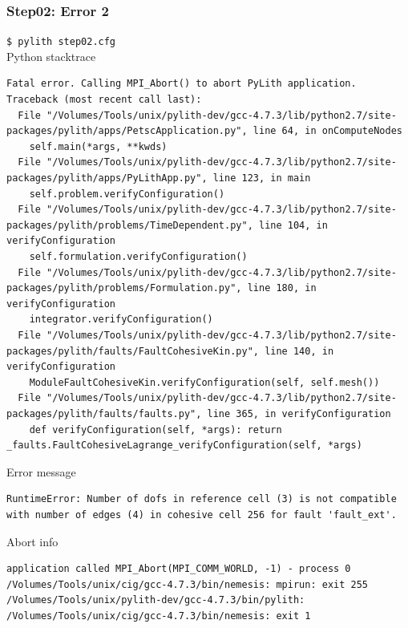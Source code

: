 \documentclass{beamer}
\newcommand{\cmd}[1]{{\tiny\tt \color{ltred}#1}}
\newcommand{\errlabel}[1]{{\small \color{blue}#1}}
\begin{document}
\begin{frame}[fragile]
  \frametitle{Step02: Error 2}

\cmd{\$ pylith step02.cfg}\\
\errlabel{Python stacktrace}
\begin{lstlisting}
Fatal error. Calling MPI_Abort() to abort PyLith application.
Traceback (most recent call last):
  File "/Volumes/Tools/unix/pylith-dev/gcc-4.7.3/lib/python2.7/site-packages/pylith/apps/PetscApplication.py", line 64, in onComputeNodes
    self.main(*args, **kwds)
  File "/Volumes/Tools/unix/pylith-dev/gcc-4.7.3/lib/python2.7/site-packages/pylith/apps/PyLithApp.py", line 123, in main
    self.problem.verifyConfiguration()
  File "/Volumes/Tools/unix/pylith-dev/gcc-4.7.3/lib/python2.7/site-packages/pylith/problems/TimeDependent.py", line 104, in verifyConfiguration
    self.formulation.verifyConfiguration()
  File "/Volumes/Tools/unix/pylith-dev/gcc-4.7.3/lib/python2.7/site-packages/pylith/problems/Formulation.py", line 180, in verifyConfiguration
    integrator.verifyConfiguration()
  File "/Volumes/Tools/unix/pylith-dev/gcc-4.7.3/lib/python2.7/site-packages/pylith/faults/FaultCohesiveKin.py", line 140, in verifyConfiguration
    ModuleFaultCohesiveKin.verifyConfiguration(self, self.mesh())
  File "/Volumes/Tools/unix/pylith-dev/gcc-4.7.3/lib/python2.7/site-packages/pylith/faults/faults.py", line 365, in verifyConfiguration
    def verifyConfiguration(self, *args): return
_faults.FaultCohesiveLagrange_verifyConfiguration(self, *args)
\end{lstlisting}
\errlabel{Error message}
\begin{lstlisting}
RuntimeError: Number of dofs in reference cell (3) is not compatible
with number of edges (4) in cohesive cell 256 for fault 'fault_ext'.
\end{lstlisting}
\errlabel{Abort info}
\begin{lstlisting}
application called MPI_Abort(MPI_COMM_WORLD, -1) - process 0
/Volumes/Tools/unix/cig/gcc-4.7.3/bin/nemesis: mpirun: exit 255
/Volumes/Tools/unix/pylith-dev/gcc-4.7.3/bin/pylith: /Volumes/Tools/unix/cig/gcc-4.7.3/bin/nemesis: exit 1
\end{lstlisting}
  
\end{frame}
\end{document}
